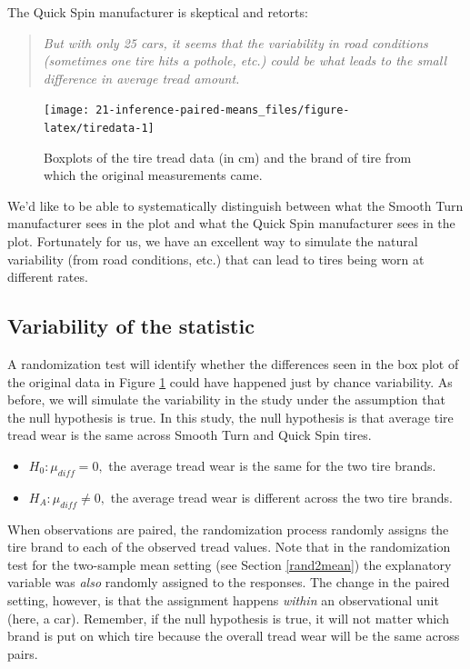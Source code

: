\documentclass[
  10pt,
  openany]{book}
\providecommand{\tightlist}{%
  \setlength{\itemsep}{0pt}\setlength{\parskip}{0pt}}
\begin{document}
The Quick Spin manufacturer is skeptical and retorts:

\begin{quote}
\emph{But with only 25 cars, it seems that the variability in road conditions (sometimes one tire hits a pothole, etc.) could be what leads to the small difference in average tread amount.}
\end{quote}

\begin{figure}[h]

{\centering \texttt{[image: 21-inference-paired-means\_files/figure-latex/tiredata-1]} 

}

\caption{Boxplots of the tire tread data (in cm) and the brand of tire from which the original measurements came.}\label{fig:tiredata}
\end{figure}

We'd like to be able to systematically distinguish between what the Smooth Turn manufacturer sees in the plot and what the Quick Spin manufacturer sees in the plot.
Fortunately for us, we have an excellent way to simulate the natural variability (from road conditions, etc.) that can lead to tires being worn at different rates.

\hypertarget{variability-of-the-statistic-14}{%
\subsection{Variability of the statistic}\label{variability-of-the-statistic-14}}

A randomization test will identify whether the differences seen in the box plot of the original data in Figure \ref{fig:tiredata} could have happened just by chance variability.
As before, we will simulate the variability in the study under the assumption that the null hypothesis is true.
In this study, the null hypothesis is that average tire tread wear is the same across Smooth Turn and Quick Spin tires.

\begin{itemize}
\tightlist
\item
  \(H_0: \mu_{diff} = 0,\) the average tread wear is the same for the two tire brands.
\item
  \(H_A: \mu_{diff} \ne 0,\) the average tread wear is different across the two tire brands.
\end{itemize}

When observations are paired, the randomization process randomly assigns the tire brand to each of the observed tread values.
Note that in the randomization test for the two-sample mean setting (see Section \ref{rand2mean}) the explanatory variable was \emph{also} randomly assigned to the responses.
The change in the paired setting, however, is that the assignment happens \emph{within} an observational unit (here, a car).
Remember, if the null hypothesis is true, it will not matter which brand is put on which tire because the overall tread wear will be the same across pairs.
\end{document}

